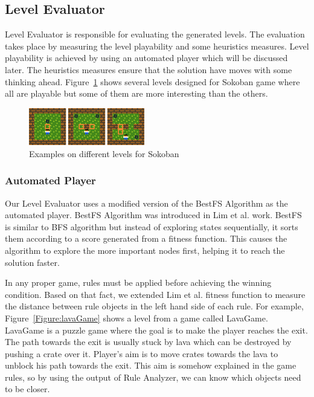 \documentclass[letterpaper]{article}
\newcommand{\figref}[1]{Figure~\ref{Figure:#1}}
\begin{document}
\subsection{Level Evaluator}
Level Evaluator is responsible for evaluating the generated levels. The evaluation takes place by measuring the level playability and some heuristics measures. Level playability is achieved by using an automated player which will be discussed later. The heuristics measures ensure that the solution have moves with some thinking ahead. \figref{diffLevelsSokoban} shows several levels designed for Sokoban game where all are playable but some of them are more interesting than the others.
\begin{figure}[ht]
  	\centering
    \includegraphics[width=0.45\textwidth]{Images/diffLevelsSokoban}
    \caption{Examples on different levels for Sokoban}
    \label{Figure:diffLevelsSokoban}
\end{figure}

\subsubsection{Automated Player}
Our Level Evaluator uses a modified version of the BestFS Algorithm as the automated player. BestFS Algorithm was introduced in Lim et al.\cite{puzzleScriptGeneration} work. BestFS is similar to BFS algorithm but instead of exploring states sequentially, it sorts them according to a score generated from a fitness function. This causes the algorithm to explore the more important nodes first, helping it to reach the solution faster.\\\par

In any proper game, rules must be applied before achieving the winning condition. Based on that fact, we extended Lim et al. fitness function to measure the distance between rule objects in the left hand side of each rule. For example, \figref{lavaGame} shows a level from a game called LavaGame. LavaGame is a puzzle game where the goal is to make the player reaches the exit. The path towards the exit is usually stuck by lava which can be destroyed by pushing a crate over it. Player's aim is to move crates towards the lava to unblock his path towards the exit. This aim is somehow explained in the game rules, so by using the output of Rule Analyzer, we can know which objects need to be closer.
\end{document}
